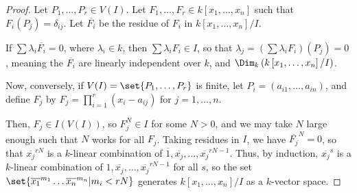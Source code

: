 \documentclass[10pt]{mypackage}
\begin{document}
\begin{proof}
  Let $P_1,\dots,P_r\in V(I)$. Let $F_1,\dots,F_r\in k\left[ x_1,\dots,x_n \right]$ such that $F_i(P_j) = \delta_{ij}$. Let $\overline{F_i}$ be the residue of $F_i$ in $k\left[ x_1,\dots,x_n \right]/I$.\newline

  If $\sum \lambda_i \overline{F_i} = 0$, where $\lambda_i\in k$, then $\sum \lambda_iF_i\in I$, so that $\lambda_j = \left( \sum \lambda_iF_i \right)\left( P_j \right) = 0$, meaning the $\overline{F_i}$ are linearly independent over $k$, and $\Dim_k\left( k\left[ x_1,\dots,x_n \right]/I \right)$.\newline

  Now, conversely, if $V(I) = \set{P_1,\dots,P_r}$ is finite, let $P_i = \left( a_{i1},\dots,a_{in} \right)$, and define $F_j$ by $F_j = \prod_{i=1}^{r}\left( x_i-a_{ij} \right)$ for $j=1,\dots,n$.\newline

  Then, $F_j\in I(V(I))$, so $F_j^{N}\in I$ for some $N > 0$, and we may take $N$ large enough such that $N$ works for all $F_j$. Taking residues in $I$, we have $\overline{F_j}^N = 0$, so that $\overline{x_j}^{rN}$ is a $k$-linear combination of $\overline{1},\overline{x_j},\dots,\overline{x_j}^{rN-1}$. Thus, by induction, $\overline{x_j}^{s}$ is a $k$-linear combination of $1,\overline{x_j},\dots,\overline{x_j}^{rN - 1}$ for all $s$, so the set $\set{\overline{x_1}^{m_1}\dots\overline{x_n}^{m_n} | m_i < rN}$ generates $k\left[ x_1,\dots,x_n \right]/I$ as a $k$-vector space.
\end{proof}
\end{document}
